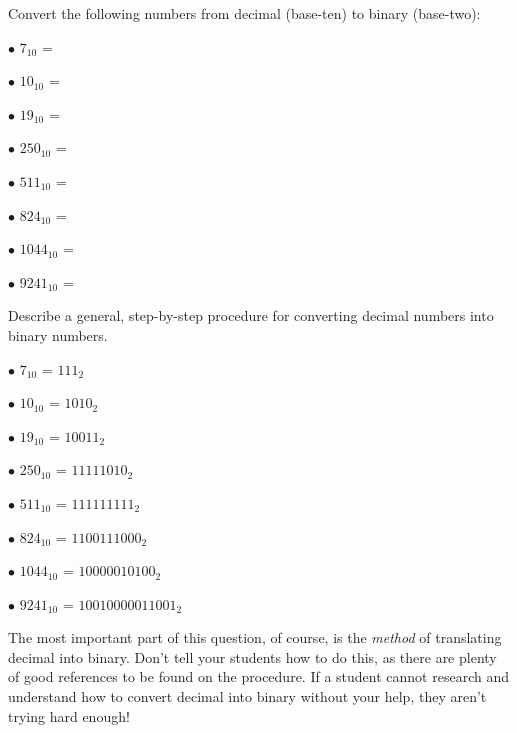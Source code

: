 

Convert the following numbers from decimal (base-ten) to binary (base-two):

\medskip
\item{$\bullet$} $7_{10}$ =
\item{$\bullet$} $10_{10}$ =
\item{$\bullet$} $19_{10}$ =
\item{$\bullet$} $250_{10}$ =
\item{$\bullet$} $511_{10}$ =
\item{$\bullet$} $824_{10}$ =
\item{$\bullet$} $1044_{10}$ =
\item{$\bullet$} $9241_{10}$ =
\medskip

Describe a general, step-by-step procedure for converting decimal numbers into binary numbers.







\medskip
\item{$\bullet$} $7_{10}$ = $111_2$
\item{$\bullet$} $10_{10}$ = $1010_2$
\item{$\bullet$} $19_{10}$ = $10011_2$
\item{$\bullet$} $250_{10}$ = $11111010_2$
\item{$\bullet$} $511_{10}$ = $111111111_2$
\item{$\bullet$} $824_{10}$ = $1100111000_2$
\item{$\bullet$} $1044_{10}$ = $10000010100_2$
\item{$\bullet$} $9241_{10}$ = $10010000011001_2$
\medskip







The most important part of this question, of course, is the {\it method} of translating decimal into binary.  Don't tell your students how to do this, as there are plenty of good references to be found on the procedure.  If a student cannot research and understand how to convert decimal into binary without your help, they aren't trying hard enough!




